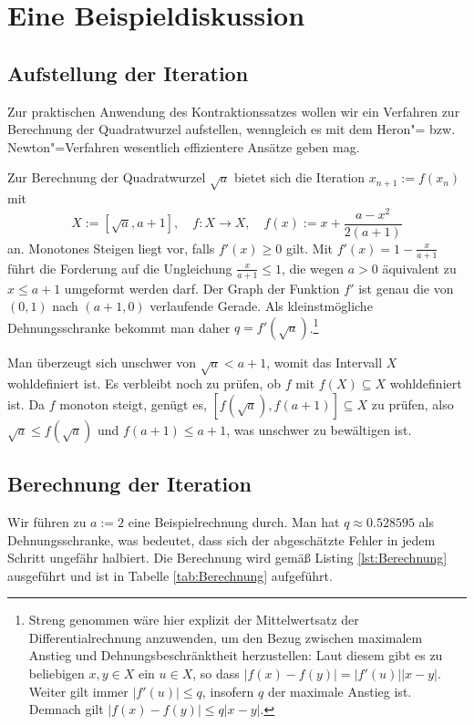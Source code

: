 \documentclass[
  a4paper, 11pt, fleqn, twoside,
  abstract=true
]{scrartcl}
\theoremstyle{plain}
\theoremstyle{definition}
\begin{document}
\section{Eine Beispieldiskussion}

\subsection{Aufstellung der Iteration}

Zur praktischen Anwendung des Kontraktionssatzes wollen wir ein
Verfahren zur Berechnung der Quadratwurzel aufstellen, wenngleich
es mit dem Heron"= bzw. Newton"=Verfahren wesentlich
effizientere Ansätze geben mag.

Zur Berechnung der Quadratwurzel $\sqrt{a}$ bietet sich
die Iteration $x_{n+1} := f(x_n)$ mit
\[X :=[\sqrt{a},a+1],\quad f\colon X\to X, \quad
f(x) := x + \frac{a-x^2}{2(a+1)}\]
an. Monotones Steigen liegt vor, falls $f'(x)\ge 0$ gilt. Mit
$f'(x) = 1 - \frac{x}{a+1}$ führt die Forderung auf die Ungleichung
$\frac{x}{a+1}\le 1$, die wegen $a>0$ äquivalent zu $x\le a+1$ umgeformt
werden darf. Der Graph der Funktion $f'$ ist genau die von $(0,1)$
nach $(a+1,0)$ verlaufende Gerade. Als kleinstmögliche Dehnungsschranke
bekommt man daher $q=f'(\sqrt{a})$.\footnote{Streng genommen wäre hier
explizit der Mittelwertsatz der Differentialrechnung anzuwenden, um den
Bezug zwischen maximalem Anstieg und Dehnungsbeschränktheit herzustellen:
Laut diesem gibt es zu beliebigen $x,y\in X$ ein $u\in X$, so dass
$|f(x)-f(y)| = |f'(u)||x-y|$. Weiter gilt immer $|f'(u)|\le q$, insofern
$q$ der maximale Anstieg ist. Demnach gilt $|f(x)-f(y)| \le q|x-y|$.}

Man überzeugt sich unschwer von $\sqrt{a}<a+1$, womit das Intervall $X$
wohldefiniert ist. Es verbleibt noch zu prüfen, ob $f$ mit $f(X)\subseteq X$
wohldefiniert ist. Da $f$ monoton steigt, genügt es,
$[f(\sqrt{a}),f(a+1)]\subseteq X$ zu prüfen, also $\sqrt{a}\le f(\sqrt{a})$
und $f(a+1)\le a+1$, was unschwer zu bewältigen ist.

\subsection{Berechnung der Iteration}

Wir führen zu $a := 2$ eine Beispielrechnung durch. Man hat
$q\approx 0.528595$ als Dehnungsschranke, was bedeutet, dass sich der
abgeschätzte Fehler in jedem Schritt ungefähr halbiert. Die Berechnung
wird gemäß Listing \ref{lst:Berechnung} ausgeführt und ist in
Tabelle \ref{tab:Berechnung} aufgeführt.
\end{document}
